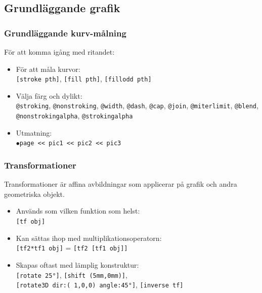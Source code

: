 \documentclass[noamsthm,handout]{beamer}
\begin{document}
\subsection{Grundläggande grafik}
\begin{frame}\frametitle{Grundläggande kurv-målning}
  För att komma igång med ritandet:
  \begin{itemize}
  \item För att måla kurvor:\\
    \texttt{[{\color{red}stroke} pth]}, \texttt{[{\color{red}fill} pth]}, \texttt{[{\color{red}fillodd} pth]}
  \item Välja färg och dylikt:\\
    \texttt{@stroking}, \texttt{@nonstroking}, \texttt{@width}, \texttt{@dash}, \texttt{@cap}, \texttt{@join}, \texttt{@miterlimit}, \texttt{@blend}, \texttt{@nonstrokingalpha}, \texttt{@strokingalpha}
  \item Utmatning:\\
    \texttt{$\bullet$page <{}< pic1 <{}< pic2 <{}< pic3}
  \end{itemize}
\end{frame}
\begin{frame}\frametitle{Transformationer}
  Transformationer är affina avbildningar som applicerar på grafik och andra geometriska objekt.
  \begin{itemize}
  \item Används som vilken funktion som helst:\\
    \texttt{[tf obj]}
  \item Kan sättas ihop med multiplikationsoperatorn:\\
    \texttt{[tf2*tf1 obj]} = \texttt{[tf2 [tf1 obj]]}
  \item Skapas oftast med lämplig konstruktur:\\
    \texttt{[rotate 25°]}, \texttt{[shift (5mm,0mm)]}, \\
    \texttt{[rotate3D dir:(~1,0,0) angle:45°]}, \texttt{[inverse tf]}
  \end{itemize}
\end{frame}
\end{document}

